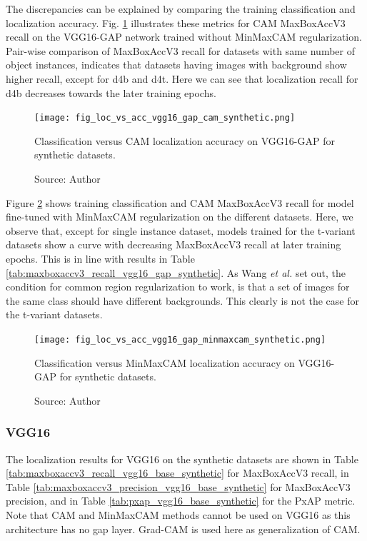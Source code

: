 The discrepancies can be explained by comparing the training classification and localization accuracy. Fig. \ref{fig:loc_vs_acc_vgg16_gap_cam_synthetic}  illustrates these metrics for CAM MaxBoxAccV3 recall on the VGG16-GAP network trained without MinMaxCAM regularization. Pair-wise comparison of MaxBoxAccV3 recall for datasets with same number of object instances, indicates that datasets having images with background show higher recall, except for d4b and d4t. Here we can see that localization recall for d4b decreases towards the later training epochs.

\begin{figure}[h]
    \begin{center}       
    \texttt{[image: fig\_loc\_vs\_acc\_vgg16\_gap\_cam\_synthetic.png]}
    \caption[Classification versus CAM localization accuracy on VGG16-GAP for synthetic datasets]{Classification versus CAM localization accuracy on VGG16-GAP for synthetic datasets.}
    \caption*{Source: Author}
    \label{fig:loc_vs_acc_vgg16_gap_cam_synthetic}
    \end{center}
\end{figure}

Figure \ref{fig:loc_vs_acc_vgg16_gap_minmaxcam_synthetic} shows training classification and CAM MaxBoxAccV3 recall for model fine-tuned with MinMaxCAM regularization on the different datasets. Here, we observe that, except for single instance dataset, models trained for the t-variant datasets show a curve with decreasing MaxBoxAccV3 recall at later training epochs. This is in line with results in Table \ref{tab:maxboxaccv3_recall_vgg16_gap_synthetic}. As Wang \textit{et al.} \cite{wang2021minmaxcam} set out, the condition for common region regularization to work, is that a set of images for the same class should have different backgrounds. This clearly is not the case for the t-variant datasets.

\begin{figure}[ht]
    \begin{center}       
    \texttt{[image: fig\_loc\_vs\_acc\_vgg16\_gap\_minmaxcam\_synthetic.png]}
    \caption[Classification versus MinMaxCAM localization accuracy on VGG16-GAP for synthetic datasets]{Classification versus MinMaxCAM localization accuracy on VGG16-GAP for synthetic datasets.}
    \caption*{Source: Author}
    \label{fig:loc_vs_acc_vgg16_gap_minmaxcam_synthetic}
    \end{center}
\end{figure}

\subsubsection{VGG16}
The localization results for VGG16 on the synthetic datasets are shown in Table \ref{tab:maxboxaccv3_recall_vgg16_base_synthetic} for MaxBoxAccV3 recall, in Table \ref{tab:maxboxaccv3_precision_vgg16_base_synthetic} for MaxBoxAccV3 precision, and in Table \ref{tab:pxap_vgg16_base_synthetic} for the PxAP metric. Note that CAM and MinMaxCAM methods cannot be used on VGG16 as this architecture has no \acrshort{gap} layer. Grad-CAM is used here as generalization of CAM.

